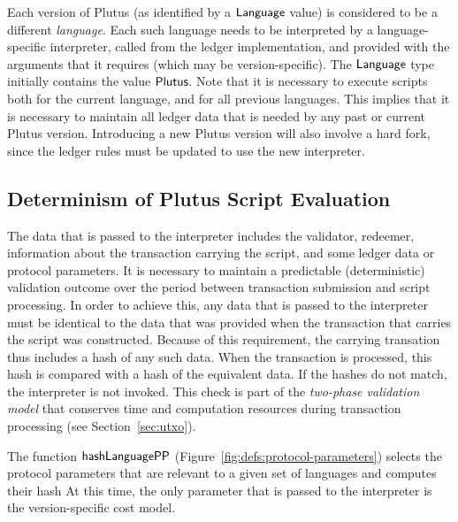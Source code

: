 Each version of Plutus (as identified by a $\mathsf{Language}$ value) is considered to be a different
\emph{language}.  Each such language needs to be interpreted by a language-specific interpreter, called from the ledger implementation,
and provided with the arguments that it requires (which may be version-specific).
The $\mathsf{Language}$ type initially contains the value $\mathsf{Plutus}$.
Note that it is necessary to execute scripts both for the current language, and for all previous languages.
%
This implies that it is necessary to maintain all ledger
data that is needed by any past or current Plutus version. Introducing a new Plutus version will also
involve a hard fork, since the ledger rules must be updated to use the new interpreter.

\subsection{Determinism of Plutus Script Evaluation}
\label{sec:determinism}

The data that is passed to the interpreter
includes the validator, redeemer, information about the transaction carrying
the script, and some ledger data or protocol parameters.
It is necessary to maintain a predictable (deterministic) validation outcome over the period between transaction
submission and script processing.
%
In order to achieve this,
any data that is passed to the interpreter must be
identical to the data that was provided when the transaction that carries the script was
constructed.
Because of this requirement, the carrying transation thus includes a hash of any such data.
When the transaction is processed, this hash is compared with a hash of the equivalent data. If the hashes do not match, the interpreter is not invoked.
This check is part of the \emph{two-phase validation model} that conserves time and computation
resources during transaction processing (see Section~\ref{sec:utxo}).

The function $\mathsf{hashLanguagePP}$ (Figure~\ref{fig:defs:protocol-parameters}) selects the protocol parameters that are relevant to
a given set of languages and computes their hash
%
At this time, the only parameter that is passed to the interpreter is the version-specific cost model.

